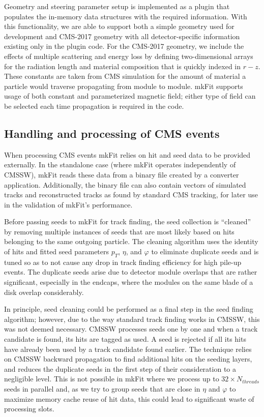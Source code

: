 \documentclass{webofc}
\def\mkfit{mkFit\xspace}
\begin{document}
Geometry and steering parameter setup is implemented as a plugin that
populates the in-memory data structures with the required information. With
this functionality, we are able to support both a simple geometry used for development and
CMS-2017 geometry with all detector-specific information existing only in the
plugin code. For the CMS-2017 geometry, we include the effects of multiple
scattering and energy loss by defining two-dimensional arrays for the
radiation length and material composition that is quickly indexed in
$r-z$. These constants are taken from CMS simulation for the amount of
material a particle would traverse propagating from module to module. \mkfit
supports usage of both constant and parameterized magnetic field; either type of field can
be selected each time propagation is required in the code.

\subsection{Handling and processing of CMS events}
\label{ssec:cms-event-processing}

When processing CMS events \mkfit relies on hit and seed data to be provided
externally. In the standalone case (where mkFit operates independently of CMSSW),
\mkfit reads these data from a binary file
created by a converter application. Additionally, the binary file can also 
contain vectors of simulated tracks and reconstructed tracks as found by 
standard CMS tracking, for later use in the validation of \mkfit's performance.

Before passing seeds to \mkfit for track finding, the seed collection is
``cleaned'' by removing multiple instances of seeds that are most likely 
based on hits belonging to the same outgoing particle. The cleaning
algorithm uses the identity of hits and fitted seed parameters $p_T$, $\eta$,
and $\varphi$ to eliminate duplicate seeds and is tuned so as to not cause any
drop in track finding efficiency for high pile-up events. The duplicate seeds
arise due to detector module overlaps that are rather significant, especially
in the endcaps, where the modules on the same blade of a disk overlap considerably.

In principle, seed cleaning could be performed as a final step in the seed
finding algorithm; however, due to the way standard track finding works in
CMSSW, this was not deemed necessary. CMSSW processes seeds one by one and
when a track candidate is found, its hits are tagged as used. A seed is
rejected if all its hits have already been used by a track candidate found
earlier. The technique relies on CMSSW backward propagation to find additional
hits on the seeding layers, and reduces the duplicate seeds in the first step
of their consideration to a negligible level. This is
not possible in \mkfit where we process up to $32 \times N_{threads}$ seeds in parallel and, as we
try to group seeds that are close in $\eta$ and $\varphi$ to
maximize memory cache reuse of hit data, this could lead to significant waste
of processing slots.
\end{document}
